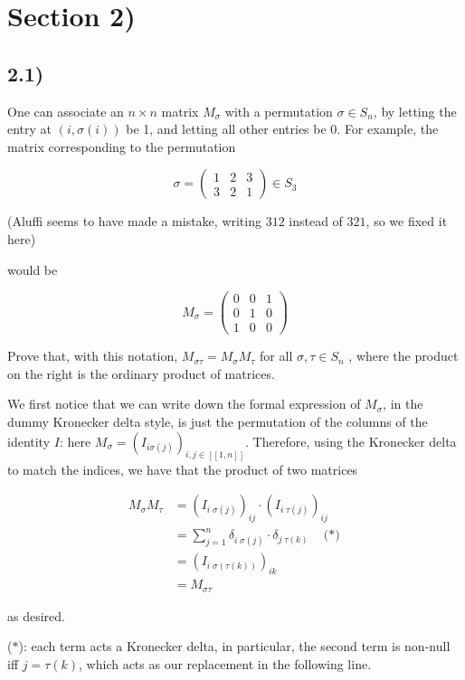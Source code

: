 \section*{Section 2)}

\subsection*{2.1)}

One can associate an $n \times n$ matrix $M_\sigma$ with a permutation $\sigma \in S_n$, by letting the entry at $(i, \sigma(i))$ be 1, and letting all other entries be 0. For example, the matrix corresponding to the permutation

$$
\sigma =
	\begin{pmatrix}
		1 & 2 & 3 \\
		3 & 2 & 1
	\end{pmatrix}
\in S_3
$$

(Aluffi seems to have made a mistake, writing $3 1 2$ instead of $3 2 1$, so we fixed it here)

would be

$$
M_\sigma =
	\begin{pmatrix}
		0 & 0 & 1 \\
		0 & 1 & 0 \\
		1 & 0 & 0
	\end{pmatrix}
$$

Prove that, with this notation, $M_{\sigma\tau} = M_\sigma M_\tau$ for all $\sigma, \tau \in S_n$ , where the product on the right is the ordinary product of matrices.

We first notice that we can write down the formal expression of $M_\sigma$, in the dummy Kronecker delta style, is just the permutation of the columns of the identity $I$: here $M_\sigma = (I_{i \sigma(j)})_{i,j \in [[1,n]]}$.  Therefore, using the Kronecker delta to match the indices, we have that the product of two matrices

$$
\begin{aligned}
M_\sigma M_\tau
&= (I_{i \; \sigma(j)})_{ij} \cdot (I_{i \; \tau(j)})_{ij} \\
&= \sum_{j=1}^n \delta_{i \; \sigma(j)} \cdot \delta_{j \; \tau(k)} \quad \text{($\ast$)}\\
&= (I_{i \; \sigma(\tau(k))})_{ik} \\
&= M_{\sigma\tau}
\end{aligned}
$$

as desired.

($\ast$): each term acts a Kronecker delta, in particular, the second term is non-null iff $j = \tau(k)$, which acts as our replacement in the following line.



